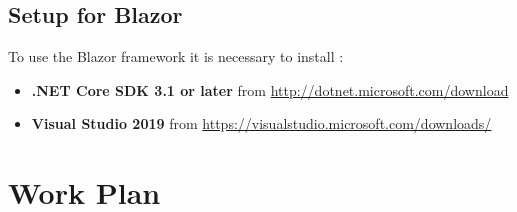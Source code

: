 \documentclass{scrartcl}
\begin{document}
\subsection{Setup for Blazor}
To use the Blazor framework it is necessary to install :\\
\begin{itemize}
\item \textbf{.NET Core SDK 3.1 or later} from \url {http://dotnet.microsoft.com/download}
\item \textbf{Visual Studio 2019} from \url {https://visualstudio.microsoft.com/downloads/}
\end{itemize}








\section{Work Plan}
  		
\end{document}
